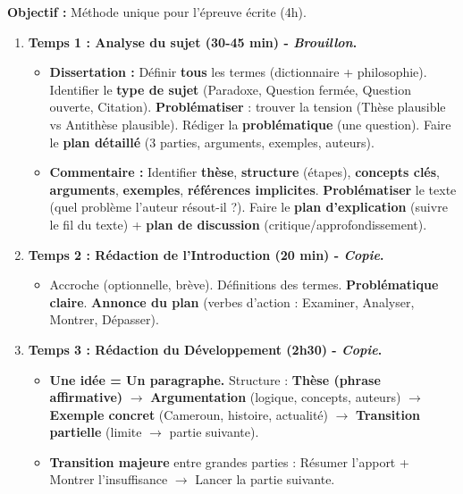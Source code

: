 \documentclass[11pt]{article}
\begin{document}
\begin{methode}
\textbf{Objectif :} Méthode unique pour l'épreuve écrite (4h).
\begin{enumerate}
    \item \textbf{Temps 1 : Analyse du sujet (30-45 min) - \emph{Brouillon}.}
    \begin{itemize}
        \item \textbf{Dissertation :} Définir \textbf{tous} les termes (dictionnaire + philosophie). Identifier le \textbf{type de sujet} (Paradoxe, Question fermée, Question ouverte, Citation). \textbf{Problématiser} : trouver la tension (Thèse plausible vs Antithèse plausible). Rédiger la \textbf{problématique} (une question). Faire le \textbf{plan détaillé} (3 parties, arguments, exemples, auteurs).
        \item \textbf{Commentaire :} Identifier \textbf{thèse}, \textbf{structure} (étapes), \textbf{concepts clés}, \textbf{arguments}, \textbf{exemples}, \textbf{références implicites}. \textbf{Problématiser} le texte (quel problème l'auteur résout-il ?). Faire le \textbf{plan d'explication} (suivre le fil du texte) + \textbf{plan de discussion} (critique/approfondissement).
    \end{itemize}
    \item \textbf{Temps 2 : Rédaction de l'Introduction (20 min) - \emph{Copie}.}
    \begin{itemize}
        \item Accroche (optionnelle, brève). Définitions des termes. \textbf{Problématique claire}. \textbf{Annonce du plan} (verbes d'action : Examiner, Analyser, Montrer, Dépasser).
    \end{itemize}
    \item \textbf{Temps 3 : Rédaction du Développement (2h30) - \emph{Copie}.}
    \begin{itemize}
        \item \textbf{Une idée = Un paragraphe.} Structure : \textbf{Thèse (phrase affirmative)} $\rightarrow$ \textbf{Argumentation} (logique, concepts, auteurs) $\rightarrow$ \textbf{Exemple concret} (Cameroun, histoire, actualité) $\rightarrow$ \textbf{Transition partielle} (limite $\rightarrow$ partie suivante).
        \item \textbf{Transition majeure} entre grandes parties : Résumer l'apport + Montrer l'insuffisance $\rightarrow$ Lancer la partie suivante.
    \end{itemize}

\end{enumerate}
\end{methode}
\end{document}
